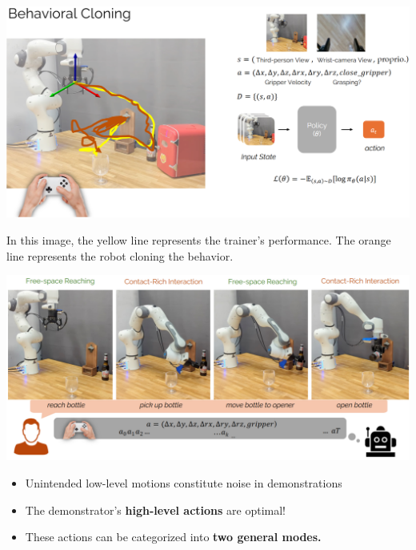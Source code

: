 \documentclass[10pt]{article}
\begin{document}
\begin{center}
    \includegraphics*[width=\textwidth]{L2_11.png}
\end{center}
In this image, the yellow line represents the trainer's performance.  The orange line represents the robot cloning the behavior.
\begin{center}
    \includegraphics*[width=\textwidth]{L2_12.png}
\end{center}
\begin{itemize}
	\item Unintended low-level motions constitute noise in demonstrations
	\item The demonstrator's \textbf{high-level actions} are optimal!
	\item These actions can be categorized into \textbf{two general modes.}
\end{itemize}
\end{document}
